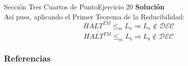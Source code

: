 \documentclass[10pt, envcountsect, presentation, aspectratio=169]{beamer}
\begin{document}

\begin{frame}{Sección Tres Cuartos de Punto}{Ejercicio 20}
    \textbf{Solución}\\
    Así pues, aplicando el Primer Teorema de la Reducibilidad:
    $$
    HALT^{TM} \leq_m L_a \Rightarrow L_a \notin \mathcal{DEC}
    $$
    $$
    \overline{HALT^{TM}} \leq_m L_b \Rightarrow L_b \notin \mathcal{DEC}
    $$
    
\end{frame}




\begin{frame} %
	\frametitle{Referencias}
	\footnotesize
	
		
\end{frame}    
		
\end{document}
